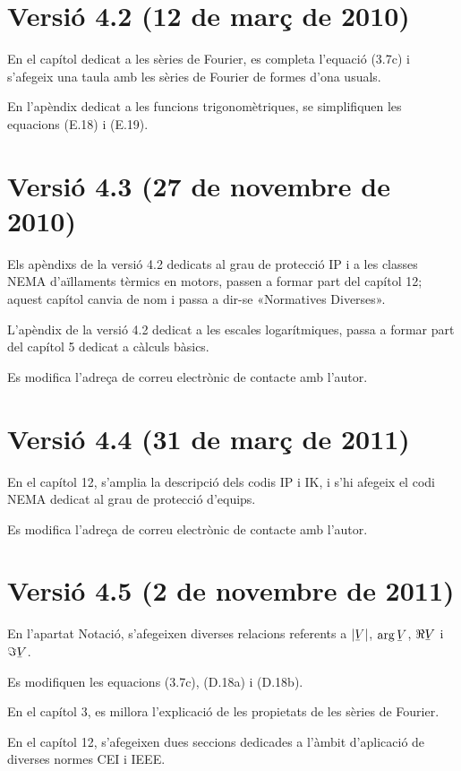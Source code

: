\section*{Versió 4.2 (12 de març de 2010)}
En el capítol dedicat a les sèries de Fourier, es completa l'equació (3.7c) i s'afegeix una taula amb les sèries de Fourier de formes d'ona usuals.

En l'apèndix dedicat a les funcions trigonomètriques, se simplifiquen les equacions (E.18) i (E.19).

\section*{Versió 4.3 (27 de novembre de 2010)}
Els apèndixs de la versió 4.2 dedicats al grau de protecció IP i  a les classes NEMA d'aïllaments tèrmics en motors, passen a formar part del capítol 12; aquest capítol canvia de nom i passa a dir-se «Normatives Diverses».

L'apèndix de la versió 4.2 dedicat a les escales logarítmiques, passa a formar part del capítol 5 dedicat a càlculs bàsics.

Es modifica l'adreça de correu electrònic de contacte amb l'autor.

\section*{Versió 4.4 (31 de març de 2011)}
En el capítol 12, s'amplia la descripció dels codis IP i IK, i s'hi afegeix el codi NEMA dedicat al grau de protecció d'equips.

Es modifica l'adreça de correu electrònic de contacte amb l'autor.

\section*{Versió 4.5 (2 de novembre de 2011)}
En l'apartat Notació, s'afegeixen diverses relacions referents a $|\cmplx{V}|$, $\arg\cmplx{V}$, $\Re\cmplx{V}$ i $\Im\cmplx{V}$.

Es modifiquen les equacions (3.7c), (D.18a) i (D.18b).

En el capítol 3, es millora l'explicació de les propietats de les sèries de Fourier.

En el capítol 12, s'afegeixen dues seccions dedicades a l'àmbit d'aplicació de diverses normes CEI i IEEE.

